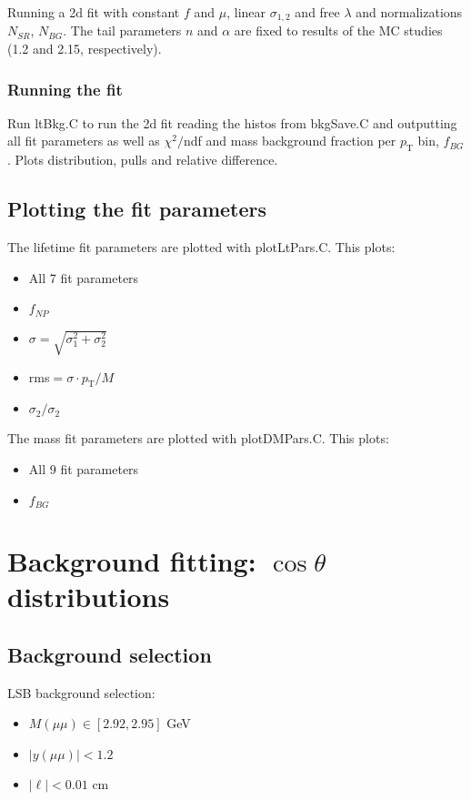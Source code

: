 \documentclass{article}
\newcommand{\pt}{p_\text{T}}
\newcommand{\cost}{\cos\theta}
\begin{document}
Running a 2d fit with constant $f$ and $\mu$, linear $\sigma_{1,2}$ and free $\lambda$ and normalizations $N_{SR}$, $N_{BG}$. The tail parameters $n$ and $\alpha$ are fixed to results of the MC studies (1.2 and 2.15, respectively). 

\subsubsection{Running the fit}

Run ltBkg.C to run the 2d fit reading the histos from bkgSave.C and outputting all fit parameters as well as $\chi^2/$ndf and mass background fraction per $\pt$ bin, $f_{BG}$. Plots distribution, pulls and relative difference.

\subsection{Plotting the fit parameters}

The lifetime fit parameters are plotted with plotLtPars.C. This plots:
\begin{itemize}
\item All 7 fit parameters
\item $f_{NP}$
\item $\sigma=\sqrt{\sigma_1^2+\sigma_2^2}$
\item rms$=\sigma\cdot\pt/M$
\item $\sigma_2/\sigma_2$
\end{itemize}

The mass fit parameters are plotted with plotDMPars.C. This plots:
\begin{itemize}
\item All 9 fit parameters
\item $f_{BG}$
\end{itemize}

\pagebreak

\section{Background fitting: $\cost$ distributions}
\subsection{Background selection}

LSB background selection:
\begin{itemize}
\item $M(\mu\mu)\in[2.92,2.95]$ GeV
\item $|y(\mu\mu)|<1.2$
\item $|\ell| < 0.01$ cm
\end{itemize}
\end{document}

